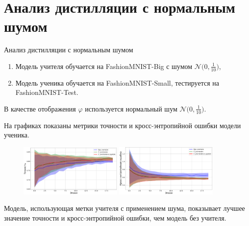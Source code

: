 \documentclass[10pt,pdf,hyperref={unicode}]{beamer}
\begin{document}
\section{Анализ дистилляции с нормальным шумом}
\begin{frame}{Анализ дистилляции с нормальным шумом}
\justifying
\begin{enumerate}[1)]
    \item Модель учителя обучается на FashionMNIST-Big с шумом $\mathcal{N}\bigr(0,\frac{1}{10}\bigr)$,
    \item Модель ученика обучается на FashionMNIST-Small, тестируется на FashionMNIST-Test.
\end{enumerate}

\par
В качестве отображения $\varphi$ используется нормальный шум $\mathcal{N}\bigr(0,\frac{1}{10}\bigr)$.

На графиках показаны метрики точности и кросс-энтропийной ошибки модели ученика.

\begin{figure}[h!]
\includegraphics[width=0.45\textwidth]{results/noise_acc.png}
\includegraphics[width=0.45\textwidth]{results/noise_loss.png}
\end{figure}

Модель, использующая метки учителя с применением шума, показывает лучшее значение точности и кросс-энтропийной ошибки, чем модель без учителя.

\end{frame}

\end{document}
